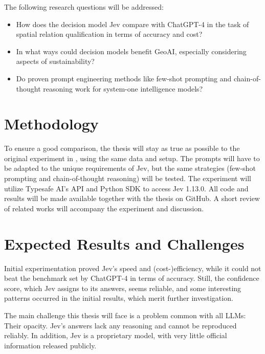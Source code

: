 The following research questions will be addressed:
\begin{itemize}
    \item How does the decision model Jev compare with ChatGPT-4 in the task of spatial relation qualification in terms of accuracy and cost?
    \item In what ways could decision models benefit GeoAI, especially considering aspects of sustainability?
    \item Do proven prompt engineering methods like few-shot prompting and chain-of-thought reasoning work for system-one intelligence models?
\end{itemize}

\section*{Methodology}
To ensure a good comparison, the thesis will stay as true as possible to the original experiment in \cite{jiFoundationModelsGeospatial2025}, using the same data and setup. The prompts will have to be adapted to the unique requirements of Jev, but the same strategies (few-shot prompting and chain-of-thought reasoning) will be tested. The experiment will utilize Typesafe AI's API and Python SDK to access Jev 1.13.0. All code and results will be made available together with the thesis on GitHub. A short review of related works will accompany the experiment and discussion.

\section*{Expected Results and Challenges}
Initial experimentation proved Jev's speed and (cost-)efficiency, while it could not beat the benchmark set by ChatGPT-4 in terms of accuracy. Still, the confidence score, which Jev assigns to its answers, seems reliable, and some interesting patterns occurred in the initial results, which merit further investigation.

The main challenge this thesis will face is a problem common with all LLMs: Their opacity. Jev's answers lack any reasoning and cannot be reproduced reliably. In addition, Jev is a proprietary model, with very little official information released publicly. 

\printbibliography


